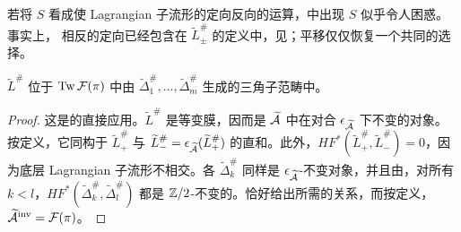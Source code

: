 \begin{note}\label{st:18.16}
若将 $S$ 看成使 Lagrangian 子流形的定向反向的运算，中出现 $S$ 似乎令人困惑。事实上，
相反的定向已经包含在 $\widetilde L_\pm^\#$ 的定义中，见；平移仅仅恢复一个共同的选择。
\end{note}

\begin{proposition}\label{st:18.17}
$\widetilde L^\#$ 位于 $\operatorname{Tw}\mathcal F(\pi)$ 中由 $\widetilde\Delta_1^\#,\ldots,\widetilde\Delta_m^\#$ 生成的三角子范畴中。
\end{proposition}
\begin{proof}
这是的直接应用。$\widetilde L^\#$ 是等变膜，因而是 $\widetilde{\mathcal A}$ 中在对合 $\epsilon_{\widetilde{\mathcal A}}$ 下不变的对象。按定义，它同构于 $\widetilde L_+^\#$ 与 $\widetilde L_-^\#=\epsilon_{\widetilde{\mathcal A}}(\widetilde L_+^\#)$ 的直和。此外，$HF^*(\widetilde L_+^\#,\widetilde L_-^\#)=0$，因为底层 Lagrangian 子流形不相交。各 $\widetilde\Delta_k^\#$ 同样是 $\epsilon_{\widetilde{\mathcal A}}$-不变对象，并且由，对所有 $k<l$，$HF^*(\widetilde\Delta_k^\#,\widetilde\Delta_l^\#)$ 都是 $\mathbb Z/2$-不变的。恰好给出所需的关系，而按定义，$\widetilde{\mathcal A}^{\mathrm{inv}}=\mathcal F(\pi)$。
\end{proof}
